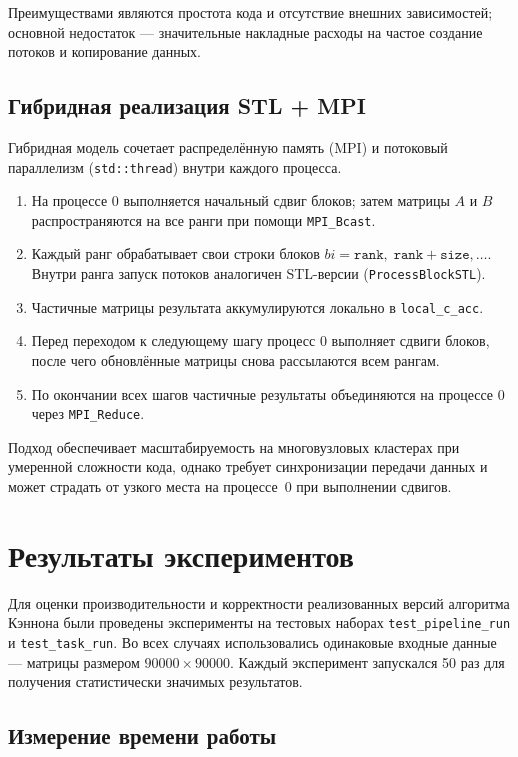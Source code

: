 \documentclass[12pt]{article}
\begin{document}
Преимуществами являются простота кода и отсутствие внешних зависимостей; основной недостаток — значительные накладные расходы на частое создание потоков и копирование данных.

\subsection*{Гибридная реализация STL + MPI}

Гибридная модель сочетает распределённую память (MPI) и потоковый параллелизм (\texttt{std::thread}) внутри каждого процесса.

\begin{enumerate}
    \item На процессе 0 выполняется начальный сдвиг блоков; затем матрицы \(A\) и \(B\) распространяются на все ранги при помощи \texttt{MPI\_Bcast}.
    \item Каждый ранг обрабатывает свои строки блоков \(bi = \texttt{rank},\; \texttt{rank} + \texttt{size},\dots\).  
          Внутри ранга запуск потоков аналогичен STL-версии (\texttt{ProcessBlockSTL}).
    \item Частичные матрицы результата аккумулируются локально в \texttt{local\_c\_acc}.
    \item Перед переходом к следующему шагу процесс 0 выполняет сдвиги блоков, после чего обновлённые матрицы снова рассылаются всем рангам.
    \item По окончании всех шагов частичные результаты объединяются на процессе 0 через \texttt{MPI\_Reduce}.
\end{enumerate}

Подход обеспечивает масштабируемость на многовузловых кластерах при умеренной сложности кода, однако требует синхронизации передачи данных и может страдать от узкого места на процессе~0 при выполнении сдвигов.

\newpage
\section*{Результаты экспериментов}

Для оценки производительности и корректности реализованных версий алгоритма Кэннона были проведены эксперименты на тестовых наборах \texttt{test\_pipeline\_run} и \texttt{test\_task\_run}. Во всех случаях использовались одинаковые входные данные — матрицы размером \(90000 \times 90000\). Каждый эксперимент запускался 50 раз для получения статистически значимых результатов.

\subsection*{Измерение времени работы}
\end{document}
